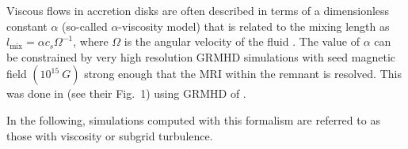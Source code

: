Viscous flows in accretion disks are often described in terms of a dimensionless constant $\alpha$
(so-called $\alpha$-viscosity model) that is related to the mixing length as 
%
$ l_{\text{mix}} = \alpha c_s \Omega^{-1} $, 
%
where $\Omega$ is the angular velocity of the fluid \citep{Shakura:1972te}.
%
The value of $\alpha$ can be constrained by very high resolution \ac{GRMHD} simulations with seed magnetic
field $(10^{15}~G)$ strong enough that the \ac{MRI} within the remnant is resolved. 
This was done in \citet{Radice:2020ids} (see their Fig.~1) using \ac{GRMHD} of \citet{Kiuchi:2017zzg}.

In the following, simulations computed with this formalism are referred to as those with 
viscosity or subgrid turbulence. 
%





